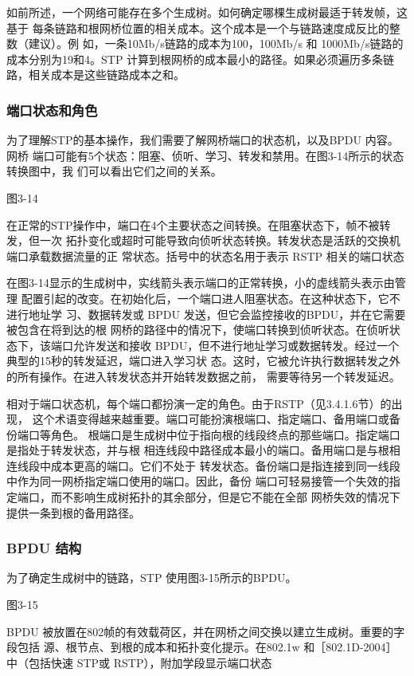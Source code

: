 如前所述，一个网络可能存在多个生成树。如何确定哪棵生成树最适于转发帧，这基于
每条链路和根网桥位置的相关成本。这个成本是一个与链路速度成反比的整数（建议）。例
如，一条10Mb/s链路的成本为100，100Mb/s 和 1000Mb/s链路的成本分别为19和4。STP
计算到根网桥的成本最小的路径。如果必须遍历多条链路，相关成本是这些链路成本之和。

\subsubsection{端口状态和角色}

为了理解STP的基本操作，我们需要了解网桥端口的状态机，以及BPDU 内容。网桥
端口可能有5个状态：阻塞、侦听、学习、转发和禁用。在图3-14所示的状态转换图中，我
们可以看出它们之间的关系。

图3-14

在正常的STP操作中，端口在4个主要状态之间转换。在阻塞状态下，帧不被转发，但一次
拓扑变化或超时可能导致向侦听状态转换。转发状态是活跃的交换机端口承载数据流量的正
常状态。括号中的状态名用于表示 RSTP 相关的端口状态

在图3-14显示的生成树中，实线箭头表示端口的正常转换，小的虚线箭头表示由管理
配置引起的改变。在初始化后，一个端口进人阻塞状态。在这种状态下，它不进行地址学
习、数据转发或 BPDU 发送，但它会监控接收的BPDU，并在它需要被包含在将到达的根
网桥的路径中的情况下，使端口转换到侦听状态。在侦听状态下，该端口允许发送和接收
BPDU，但不进行地址学习或数据转发。经过一个典型的15秒的转发延迟，端口进入学习状
态。这时，它被允许执行数据转发之外的所有操作。在进入转发状态并开始转发数据之前，
需要等待另一个转发延迟。

相对于端口状态机，每个端口都扮演一定的角色。由于RSTP（见3.4.1.6节）的出现，
这个术语变得越来越重要。端口可能扮演根端口、指定端口、备用端口或备份端口等角色。
根端口是生成树中位于指向根的线段终点的那些端口。指定端口是指处于转发状态，并与根
相连线段中路径成本最小的端口。备用端口是与根相连线段中成本更高的端口。它们不处于
转发状态。备份端口是指连接到同一线段中作为同一网桥指定端口使用的端口。因此，备份
端口可轻易接管一个失效的指定端口，而不影响生成树拓扑的其余部分，但是它不能在全部
网桥失效的情况下提供一条到根的备用路径。

\subsubsection{ BPDU 结构}

为了确定生成树中的链路，STP 使用图3-15所示的BPDU。

图3-15

BPDU 被放置在802帧的有效载荷区，并在网桥之间交换以建立生成树。重要的字段包括
源、根节点、到根的成本和拓扑变化提示。在802.1w 和［802.1D-2004］中（包括快速 STP或
RSTP），附加学段显示端口状态


